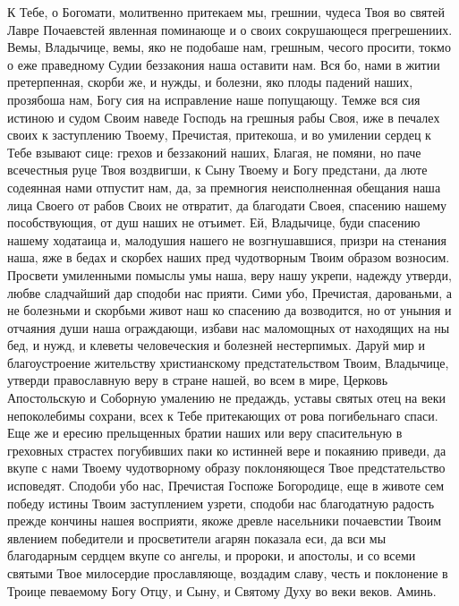 \begin{mymulticols}
К Тебе, о Богомати, молитвенно притекаем мы, грешнии, чудеса Твоя во святей Лавре Почаевстей явленная поминающе и о своих сокрушающеся прегрешениих. Вемы, Владычице, вемы, яко не подобаше нам, грешным, чесого просити, токмо о еже праведному Судии беззакония наша оставити нам. Вся бо, нами в житии претерпенная, скорби же, и нужды, и болезни, яко плоды падений наших, прозябоша нам, Богу сия на исправление наше попущающу. Темже вся сия истиною и судом Своим наведе Господь на грешныя рабы Своя, иже в печалех своих к заступлению Твоему, Пречистая, притекоша, и во умилении сердец к Тебе взывают сице: грехов и беззаконий наших, Благая, не помяни, но паче всечестныя руце Твоя воздвигши, к Сыну Твоему и Богу предстани, да люте содеянная нами отпустит нам, да, за премногия неисполненная обещания наша лица Своего от рабов Своих не отвратит, да благодати Своея, спасению нашему пособствующия, от душ наших не отъимет. Ей, Владычице, буди спасению нашему ходатаица и, малодушия нашего не возгнушавшися, призри на стенания наша, яже в бедах и скорбех наших пред чудотворным Твоим образом возносим. Просвети умиленными помыслы умы наша, веру нашу укрепи, надежду утверди, любве сладчайший дар сподоби нас прияти. Сими убо, Пречистая, дарованьми, а не болезньми и скорбьми живот наш ко спасению да возводится, но от уныния и отчаяния души наша ограждающи, избави нас маломощных от находящих на ны бед, и нужд, и клеветы человеческия и болезней нестерпимых. Даруй мир и благоустроение жительству христианскому предстательством Твоим, Владычице, утверди православную веру в стране нашей, во всем в мире, Церковь Апостольскую и Соборную умалению не предаждь, уставы святых отец на веки непоколебимы сохрани, всех к Тебе притекающих от рова погибельнаго спаси. Еще же и ересию прельщенных братии наших или веру спасительную в греховных страстех погубивших паки ко истинней вере и покаянию приведи, да вкупе с нами Твоему чудотворному образу поклоняющеся Твое предстательство исповедят. Сподоби убо нас, Пречистая Госпоже Богородице, еще в животе сем победу истины Твоим заступлением узрети, сподоби нас благодатную радость прежде кончины нашея восприяти, якоже древле насельники почаевстии Твоим явлением победители и просветители агарян показала еси, да вси мы благодарным сердцем вкупе со ангелы, и пророки, и апостолы, и со всеми святыми Твое милосердие прославляюще, воздадим славу, честь и поклонение в Троице певаемому Богу Отцу, и Сыну, и Святому Духу во веки веков. Аминь.

\end{mymulticols}

